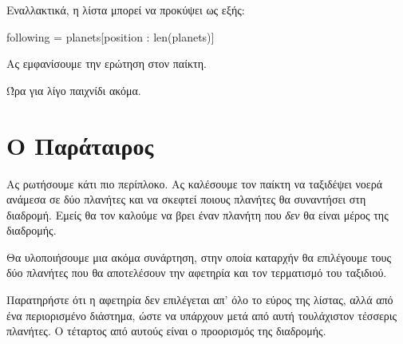\documentclass[a4paper,11pt,oneside]{book}
\begin{document}
Εναλλακτικά, η λίστα  μπορεί να προκύψει ως εξής:

\begin{pycode}
    following = planets[position : len(planets)]
\end{pycode}


Ας εμφανίσουμε την ερώτηση στον παίκτη.


Ώρα για λίγο παιχνίδι ακόμα.


\section{Ο Παράταιρος}

\begin{question}
Ας ρωτήσουμε κάτι πιο περίπλοκο. Ας καλέσουμε τον παίκτη να ταξιδέψει νοερά ανάμεσα σε δύο πλανήτες και να σκεφτεί ποιους πλανήτες θα συναντήσει στη διαδρομή. Εμείς θα τον καλούμε να βρει έναν πλανήτη που \emph{δεν} θα είναι μέρος της διαδρομής.
\end{question}

Θα υλοποιήσουμε μια ακόμα συνάρτηση, στην οποία καταρχήν θα επιλέγουμε τους δύο πλανήτες που θα αποτελέσουν την αφετηρία και τον τερματισμό του ταξιδιού.


Παρατηρήστε ότι η αφετηρία δεν επιλέγεται απ' όλο το εύρος της λίστας, αλλά από ένα περιορισμένο διάστημα, ώστε να υπάρχουν μετά από αυτή τουλάχιστον τέσσερις πλανήτες. Ο τέταρτος από αυτούς είναι ο προορισμός της διαδρομής. 
\end{document}

